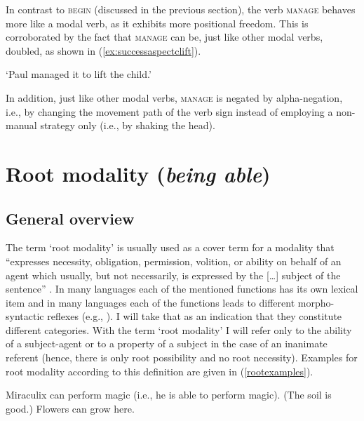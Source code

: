 \noindent In contrast to \textsc{begin} (discussed in the previous section), the verb \textsc{manage} behaves more like a modal verb, as it exhibits more positional freedom. This is corroborated by the fact that \textsc{manage} can be, just like other modal verbs, doubled, as shown in (\ref{ex:successaspectclift}).

\begin{exe}
\glt `Paul managed it to lift the child.' \label{ex:successaspectclift}
\end{exe} 

\noindent In addition, just like other modal verbs, \textsc{manage} is negated by alpha-negation, i.e., by changing the movement path of the verb sign instead of employing a non-manual strategy only (i.e., by shaking the head).


\section{Root modality (\textit{being able})}\label{rootmodality}
\subsection{General overview}
The term `root modality' is usually used as a cover term for a modality that ``expresses necessity, obligation, permission, volition, or ability on behalf of an agent which usually, but not necessarily, is expressed by the [\dots ] subject of the sentence'' \citep[44]{platzack1979semantic}. In many languages each of the mentioned functions has its own lexical item and in many languages each of the functions leads to different morpho-syntactic reflexes (e.g., \citealt{bross2017swabian}). I will take that as an indication that they constitute different categories. With the term `root modality' I will refer only to the ability of a subject-agent or to a property of a subject in the case of an inanimate referent (hence, there is only root possibility and no root necessity). Examples for root modality according to this definition are given in (\ref{rootexamples}).

\begin{exe}
\ex\label{rootexamples}\begin{xlist}
\ex Miraculix can perform magic (i.e., he is able to perform magic).
\ex (The soil is good.) Flowers can grow here.
\end{xlist}
\end{exe}

